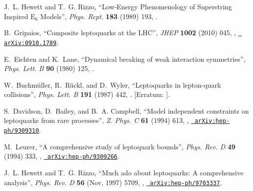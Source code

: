 \documentclass[12pt]{thesis}  %
\begin{document}
\begin{thebibliography}{100}
\hrefCMSnoop {} {J.~L. Hewett and T.~G. Rizzo, ``{Low-Energy Phenomenology of
  Superstring Inspired $\text{E}_{6}$ Models}'',} \textit{ Phys. Rept.}
  \textbf{ 183} (1989) 193,
\href{http://dx.doi.org/10.1016/0370-1573(89)90071-9}{}.

\hrefCMSnoop {} {B.~Gripaios, ``{Composite leptoquarks at the LHC}'',} \textit{
  JHEP} \textbf{ 1002} (2010) 045,
  \href{http://dx.doi.org/10.1007/JHEP02(2010)045}{},
\href{http://www.arXiv.org/abs/0910.1789}{\texttt{ arXiv:0910.1789}}.

\hrefCMSnoop {} {E.~Eichten and K.~Lane, ``Dynamical breaking of weak
  interaction symmetries'',} \textit{ Phys. Lett. B} \textbf{ 90} (1980) 125,
  \href{http://dx.doi.org/10.1016/0370-2693(80)90065-9}{}.

\hrefCMSnoop {} {W.~Buchm{\"u}ller, R.~R{\"u}ckl, and D.~Wyler, ``{Leptoquarks
  in lepton-quark collisions}'',} \textit{ Phys. Lett. B} \textbf{ 191} (1987)
  442,
  \href{http://dx.doi.org/10.1016/0370-2693(87)90637-X}{}.
  [Erratum:
  \href{http://dx.doi.org/10.1016/S0370-2693(99)00014-3}{}].

\hrefCMSnoop {} {S.~Davidson, D.~Bailey, and B.~A. Campbell, ``Model
  independent constraints on leptoquarks from rare processes'',} \textit{ Z.
  Phys. C} \textbf{ 61} (1994) 613,
  \href{http://dx.doi.org/10.1007/BF01552629}{},
  \href{http://www.arXiv.org/abs/hep-ph/9309310}{\texttt{
  arXiv:hep-ph/9309310}}.

\hrefCMSnoop {} {M.~Leurer, ``A comprehensive study of leptoquark bounds'',}
  \textit{ Phys. Rev. D} \textbf{ 49} (1994) 333,
  \href{http://dx.doi.org/10.1103/PhysRevD.49.333}{},
\href{http://www.arXiv.org/abs/hep-ph/9309266}{\texttt{ arXiv:hep-ph/9309266}}.

\hrefCMSnoop {} {J.~L. Hewett and T.~G. Rizzo, ``Much ado about leptoquarks: A
  comprehensive analysis'',} \textit{ Phys. Rev. D} \textbf{ 56} (Nov, 1997)
  5709,
  \href{http://dx.doi.org/10.1103/PhysRevD.56.5709}{},
  \href{http://www.arXiv.org/abs/hep-ph/9703337}{\texttt{
  arXiv:hep-ph/9703337}}.


\end{thebibliography}
\end{document}
